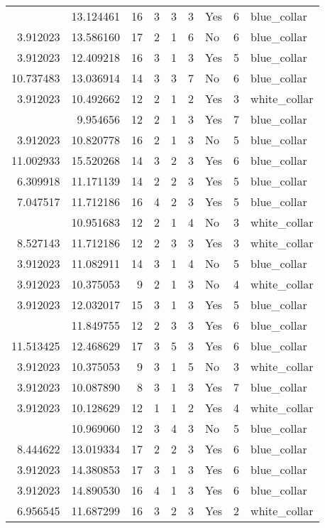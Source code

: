 \documentclass[
]{article}
\begin{document}
\begin{longtable}[t]{rrrrrllrl}
\addlinespace
8.527143 & 13.124461 & 16 & 3 & 3 & 3 & Yes & 6 & blue\_collar\\
3.912023 & 13.586160 & 17 & 2 & 1 & 6 & No & 6 & blue\_collar\\
3.912023 & 12.409218 & 16 & 3 & 1 & 3 & Yes & 5 & blue\_collar\\
10.737483 & 13.036914 & 14 & 3 & 3 & 7 & No & 6 & blue\_collar\\
3.912023 & 10.492662 & 12 & 2 & 1 & 2 & Yes & 3 & white\_collar\\
\addlinespace
3.912023 & 9.954656 & 12 & 2 & 1 & 3 & Yes & 7 & blue\_collar\\
3.912023 & 10.820778 & 16 & 2 & 1 & 3 & No & 5 & blue\_collar\\
11.002933 & 15.520268 & 14 & 3 & 2 & 3 & Yes & 6 & blue\_collar\\
6.309918 & 11.171139 & 14 & 2 & 2 & 3 & Yes & 5 & blue\_collar\\
7.047517 & 11.712186 & 16 & 4 & 2 & 3 & Yes & 5 & blue\_collar\\
\addlinespace
3.912023 & 10.951683 & 12 & 2 & 1 & 4 & No & 3 & white\_collar\\
8.527143 & 11.712186 & 12 & 2 & 3 & 3 & Yes & 3 & white\_collar\\
3.912023 & 11.082911 & 14 & 3 & 1 & 4 & No & 5 & blue\_collar\\
3.912023 & 10.375053 & 9 & 2 & 1 & 3 & No & 4 & white\_collar\\
3.912023 & 12.032017 & 15 & 3 & 1 & 3 & Yes & 5 & blue\_collar\\
\addlinespace
8.980927 & 11.849755 & 12 & 2 & 3 & 3 & Yes & 6 & blue\_collar\\
11.513425 & 12.468629 & 17 & 3 & 5 & 3 & Yes & 6 & blue\_collar\\
3.912023 & 10.375053 & 9 & 3 & 1 & 5 & No & 3 & white\_collar\\
3.912023 & 10.087890 & 8 & 3 & 1 & 3 & Yes & 7 & blue\_collar\\
3.912023 & 10.128629 & 12 & 1 & 1 & 2 & Yes & 4 & white\_collar\\
\addlinespace
10.310618 & 10.969060 & 12 & 3 & 4 & 3 & No & 5 & blue\_collar\\
8.444622 & 13.019334 & 17 & 2 & 2 & 3 & Yes & 6 & blue\_collar\\
3.912023 & 14.380853 & 17 & 3 & 1 & 3 & Yes & 6 & blue\_collar\\
3.912023 & 14.890530 & 16 & 4 & 1 & 3 & Yes & 6 & blue\_collar\\
6.956545 & 11.687299 & 16 & 3 & 2 & 3 & Yes & 2 & white\_collar\\

\end{longtable}
\end{document}
